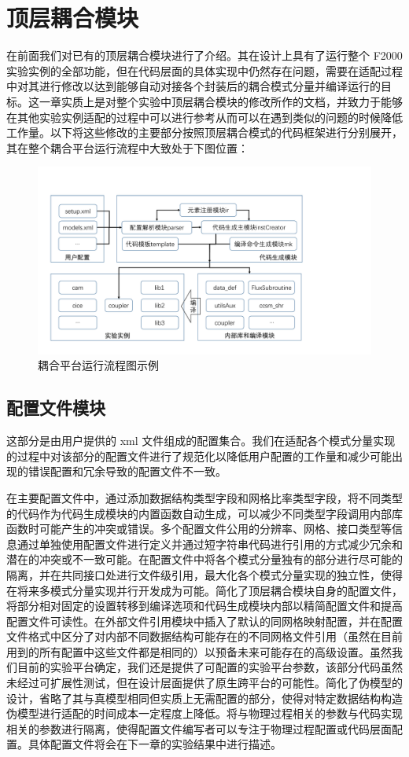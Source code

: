 \chapter{顶层耦合模块}
\label{cha:coupler}

在前面我们对已有的顶层耦合模块进行了介绍。其在设计上具有了运行整个 F2000 实验实例的全部功能，但在代码层面的具体实现中仍然存在问题，需要在适配过程中对其进行修改以达到能够自动对接各个封装后的耦合模式分量并编译运行的目标。这一章实质上是对整个实验中顶层耦合模块的修改所作的文档，并致力于能够在其他实验实例适配的过程中可以进行参考从而可以在遇到类似的问题的时候降低工作量。以下将这些修改的主要部分按照顶层耦合模式的代码框架进行分别展开，其在整个耦合平台运行流程中大致处于下图位置：
\begin{figure}[H]
\centering
\includegraphics[width=1\textwidth]{../figures/fig1.pdf}
\caption{耦合平台运行流程图示例}
\end{figure}

\section{配置文件模块}

这部分是由用户提供的 xml 文件组成的配置集合。我们在适配各个模式分量实现的过程中对该部分的配置文件进行了规范化以降低用户配置的工作量和减少可能出现的错误配置和冗余导致的配置文件不一致。

在主要配置文件中，通过添加数据结构类型字段和网格比率类型字段，将不同类型的代码作为代码生成模块的内置函数自动生成，可以减少不同类型字段调用内部库函数时可能产生的冲突或错误。多个配置文件公用的分辨率、网格、接口类型等信息通过单独使用配置文件进行定义并通过短字符串代码进行引用的方式减少冗余和潜在的冲突或不一致可能。在配置文件中将各个模式分量独有的部分进行尽可能的隔离，并在共同接口处进行文件级引用，最大化各个模式分量实现的独立性，使得在将来多模式分量实现并行开发成为可能。简化了顶层耦合模块自身的配置文件，将部分相对固定的设置转移到编译选项和代码生成模块内部以精简配置文件和提高配置文件可读性。在外部文件引用模块中插入了默认的同网格映射配置，并在配置文件格式中区分了对内部不同数据结构可能存在的不同网格文件引用（虽然在目前用到的所有配置中这些文件都是相同的）以预备未来可能存在的高级设置。虽然我们目前的实验平台确定，我们还是提供了可配置的实验平台参数，该部分代码虽然未经过可扩展性测试，但在设计层面提供了原生跨平台的可能性。简化了伪模型的设计，省略了其与真模型相同但实质上无需配置的部分，使得对特定数据结构构造伪模型进行适配的时间成本一定程度上降低。将与物理过程相关的参数与代码实现相关的参数进行隔离，使得配置文件编写者可以专注于物理过程配置或代码层面配置。具体配置文件将会在下一章的实验结果中进行描述。

